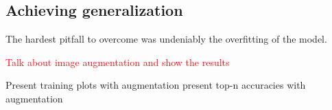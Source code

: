 \subsection{Achieving generalization}

The hardest pitfall to overcome was undeniably the overfitting of the model. 


\textcolor{red}{Talk about image augmentation and show the results}


Present training plots with augmentation
present top-n accuracies with augmentation
